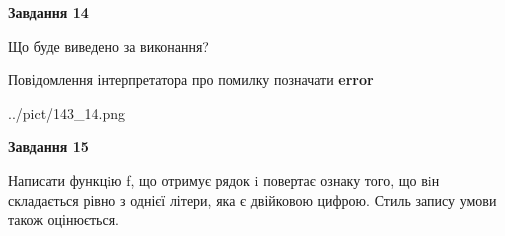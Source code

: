 \documentclass[11pt, ukrainian]{article}
\begin{document}
{\begin {large}
{\begin {center}\textbf{Завдання 14}\end {center}}\par
Що буде виведено за виконання? \par
Повідомлення інтерпретатора про помилку позначати \textbf{error}

\begin{center}
	{../pict/143_14.png}
\end{center}
\newpage

{\begin {center}\textbf{Завдання 15}\end {center}}\par

Написати функцiю f, що отримує рядок i повертає ознаку того, що вiн складається рівно з однієї літери, яка є двійковою цифрою. Стиль запису умови також оцінюється.\par
\newpage

\end {large}}
\end{document}
